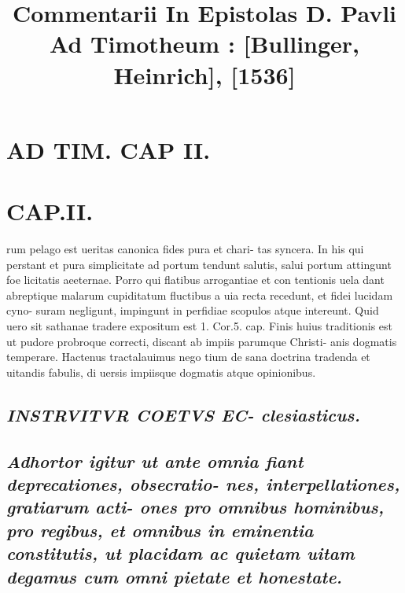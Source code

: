 \documentclass{article}
\begin{document}
\date{}
        \title{Commentarii In Epistolas D. Pavli Ad Timotheum : [Bullinger, Heinrich], [1536]}
\maketitle
\tableofcontents
\clearpage
\begin{pages} 
\beginnumbering
        
\section*{AD TIM. CAP II. }
\marginpar{[ p.107 ]}  \pend
\endnumbering\beginnumbering\section{CAP.II.}\pstart rum pelago est ueritas canonica fides pura et chari- tas syncera. In his qui perstant et pura simplicitate ad portum tendunt salutis, salui portum attingunt foe licitatis aeeternae. Porro qui flatibus arrogantiae et con tentionis uela dant abreptique malarum cupiditatum fluctibus a uia recta recedunt, et fidei lucidam cyno- suram negligunt, impingunt in perfidiae scopulos atque intereunt. Quid uero sit sathanae tradere expositum est 1. Cor.5. cap. Finis huius traditionis est ut pudore probroque correcti, discant ab impiis parumque Christi- anis dogmatis temperare. Hactenus tractalauimus nego tium de sana doctrina tradenda et uitandis fabulis, di uersis impiisque dogmatis atque opinionibus.  \pend
{}
{}
\subsection*{\textit{INSTRVITVR COETVS EC- clesiasticus. }}
{}
\subsection*{\textit{Adhortor igitur ut ante omnia fiant deprecationes, obsecratio- nes, interpellationes, gratiarum acti- ones pro omnibus hominibus, pro regibus, et omnibus in eminentia constitutis, ut placidam ac quietam uitam degamus cum omni pietate et honestate. }}

\end{pages}
\end{document}
